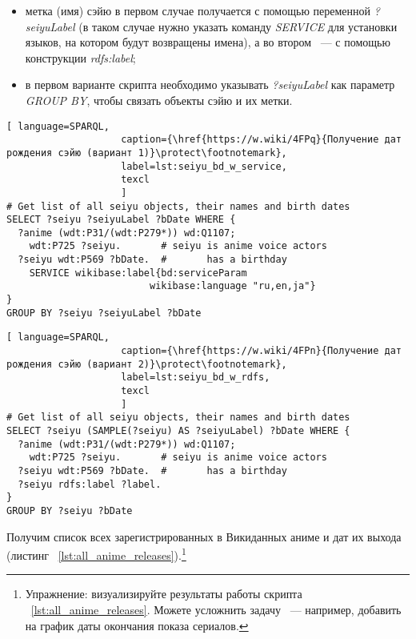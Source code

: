 \begin{itemize}
    \item метка (имя) сэйю в первом случае получается с помощью переменной \emph{?seiyuLabel} (в таком случае нужно указать команду \emph{SERVICE} для установки языков, на котором будут возвращены имена), а во втором ~--- с помощью конструкции \emph{rdfs:label};
    \item в первом варианте скрипта необходимо указывать \emph{?seiyuLabel} как параметр \emph{GROUP BY}, чтобы связать объекты сэйю и их метки.
\end{itemize}

\begin{lstlisting}[ language=SPARQL, 
                    caption={\href{https://w.wiki/4FPq}{Получение дат рождения сэйю (вариант 1)}\protect\footnotemark},
                    label=lst:seiyu_bd_w_service,
                    texcl 
                    ]
# Get list of all seiyu objects, their names and birth dates
SELECT ?seiyu ?seiyuLabel ?bDate WHERE {
  ?anime (wdt:P31/(wdt:P279*)) wd:Q1107;
    wdt:P725 ?seiyu.       # seiyu is anime voice actors
  ?seiyu wdt:P569 ?bDate.  #       has a birthday
    SERVICE wikibase:label{bd:serviceParam
					     wikibase:language "ru,en,ja"}
}
GROUP BY ?seiyu ?seiyuLabel ?bDate
\end{lstlisting}%

\begin{lstlisting}[ language=SPARQL, 
                    caption={\href{https://w.wiki/4FPn}{Получение дат рождения сэйю (вариант 2)}\protect\footnotemark},
                    label=lst:seiyu_bd_w_rdfs,
                    texcl 
                    ]
# Get list of all seiyu objects, their names and birth dates
SELECT ?seiyu (SAMPLE(?seiyu) AS ?seiyuLabel) ?bDate WHERE {
  ?anime (wdt:P31/(wdt:P279*)) wd:Q1107;
    wdt:P725 ?seiyu.       # seiyu is anime voice actors
  ?seiyu wdt:P569 ?bDate.  #       has a birthday 
  ?seiyu rdfs:label ?label.
}
GROUP BY ?seiyu ?bDate
\end{lstlisting}%

Получим список всех зарегистрированных в Викиданных аниме и дат их выхода (листинг ~\protect\ref{lst:all_anime_releases}).\footnote{Упражнение: визуализируйте результаты работы скрипта ~\protect\ref{lst:all_anime_releases}. Можете усложнить задачу ~--- например, добавить на график даты окончания показа сериалов.} 

